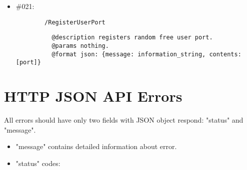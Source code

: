 \documentclass[11pt,a4paper]{scrartcl}
\begin{document}
\begin{description}
\begin{itemize}
        \item \#021:
          \begin{verbatim}
        /RegisterUserPort
          \end{verbatim}
          \begin{verbatim}
          @description registers random free user port.
          @params nothing.
          @format json: {message: information_string, contents: [port]}
          \end{verbatim}

      \end{itemize}
\end{description}

\section{HTTP JSON API Errors}\label{sec:apierrors}
  All errors should have only two fields with JSON object respond: "status" and "message".

  \begin{itemize}
    \item "message" contains detailed information about error.
    \item "status" codes:

  \end{itemize}





\end{document}
